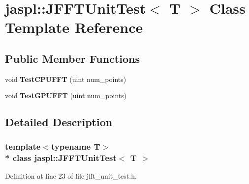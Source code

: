\hypertarget{classjaspl_1_1_j_f_f_t_unit_test}{}\section{jaspl\+:\+:J\+F\+F\+T\+Unit\+Test$<$ T $>$ Class Template Reference}
\label{classjaspl_1_1_j_f_f_t_unit_test}
\subsection*{Public Member Functions}
\begin{DoxyCompactItemize}
\item 
void {\bfseries Test\+C\+P\+U\+F\+FT} (uint num\+\_\+points)\hypertarget{classjaspl_1_1_j_f_f_t_unit_test_aa5c21d0d4009818fabb5aafe14fdf060}{}\label{classjaspl_1_1_j_f_f_t_unit_test_aa5c21d0d4009818fabb5aafe14fdf060}

\item 
void {\bfseries Test\+G\+P\+U\+F\+FT} (uint num\+\_\+points)\hypertarget{classjaspl_1_1_j_f_f_t_unit_test_a23b93712b332b7ec767c97473f8a73fb}{}\label{classjaspl_1_1_j_f_f_t_unit_test_a23b93712b332b7ec767c97473f8a73fb}

\end{DoxyCompactItemize}


\subsection{Detailed Description}
\subsubsection*{template$<$typename T$>$\\*
class jaspl\+::\+J\+F\+F\+T\+Unit\+Test$<$ T $>$}



Definition at line 23 of file jfft\+\_\+unit\+\_\+test.\+h.

